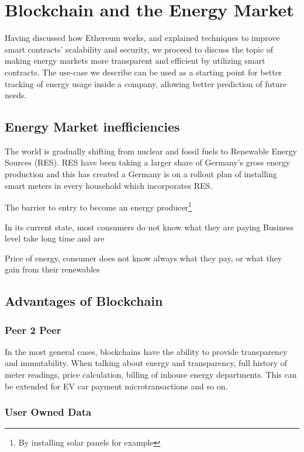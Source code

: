 \chapter{Blockchain and the Energy Market}

Having discussed how Ethereum works, and explained techniques to improve smart contracts' scalability and security, we proceed to discuss the topic of making energy markets more transparent and efficient by utilizing smart contracts. The use-case we describe can be used as a starting point for better tracking of energy usage inside a company, allowing better prediction of future needs.  

\section{Energy Market inefficiencies}

The world is gradually shifting from nuclear and fossil fuels to Renewable Energy Sources (RES). RES have been taking a larger share of Germany's gross energy production and this has created a 
Germany is on a rollout plan of installing smart meters in every household which incorporates RES.  

The barrier to entry to become an energy producer\footnote{By installing solar panels for example} 

In its current state, most consumers do not know what they are paying Business level take long time and are 

Price of energy, consumer does not know always what they pay, or what they gain from their renewables
 
\section{Advantages of Blockchain}

\subsection{Peer 2 Peer}
In the most general cases, blockchains have the ability to provide transparency and immutability. When talking about energy and transparency, full history of meter readings, price calculation, billing of inhouse energy departments. This can be extended for EV car payment microtransactions and so on.

\subsection{User Owned Data}

